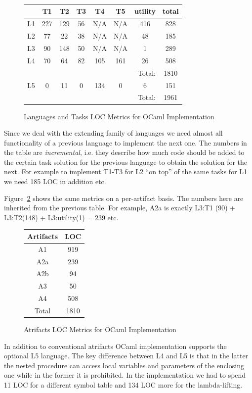 \begin{figure}
\centering
\begin{tabular}{|c||c|c|c|c|c|c||c|}
\hline
 & T1 & T2 & T3 & T4 & T5 & utility & total \\
\hline
\hline
L1 & 227 & 129 & 56 & N/A & N/A & 416 & 828 \\
L2 & 77 & 22 & 38 & N/A & N/A & 48 & 185 \\
L3 & 90 & 148 & 50 & N/A & N/A & 1 & 289 \\
L4 & 70 & 64 & 82 & 105 & 161 & 26 & 508 \\
\hline
\multicolumn{7}{|r||}{Total:} & 1810 \\
\hline
L5 & 0 & 11 & 0 & 134 & 0 & 6 & 151 \\
\hline
\multicolumn{7}{|r||}{Total:} & 1961 \\
\hline
\end{tabular}
\caption{Languages and Tasks LOC Metrics for OCaml Implementation}
\label{OCamlmap}
\end{figure}

Since we deal with the extending family of languages we need almost all functionality of a previous language 
to implement the next one. The numbers in the table are \emph{incremental}, i.e. they describe how much code 
should be added to the certain task solution for the previous language to obtain the solution for the next. 
For example to implement T1-T3 for L2 ``on top'' of the same tasks for L1 we need 185 LOC in addition etc.

Figure~\ref{OCamlarts} shows the same metrics on a per-artifact basis. The numbers here are inherited from
the previous table. For example, A2a is exactly L3:T1 (90) + L3:T2(148) + L3:utility(1) = 239 etc.

\begin{figure}
\centering
\begin{tabular}{|c||c|}
\hline
Artifacts & LOC \\
\hline
\hline
A1 & 919 \\
A2a & 239 \\
A2b & 94 \\
A3 & 50 \\
A4 & 508 \\
\hline
\hline
Total & 1810 \\
\hline
\end{tabular}
\caption{Atrifacts LOC Metrics for OCaml Implementation}
\label{OCamlarts}
\end{figure}

In addition to conventional atrifacts OCaml implementation supports the optional L5 language. The key difference 
between L4 and L5 is that in the latter the nested procedure can access local variables and parameters 
of the enclosing one while in the former it is prohibited. In the implementation we had to spend 11 LOC for a 
different symbol table and 134 LOC more for the lambda-lifting.

